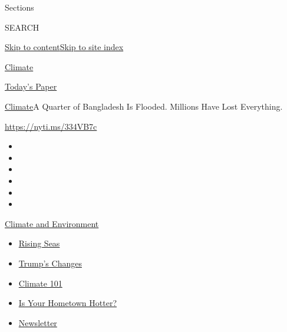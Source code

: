 Sections

SEARCH

\protect\hyperlink{site-content}{Skip to
content}\protect\hyperlink{site-index}{Skip to site index}

\href{https://www.nytimes.com/section/climate}{Climate}

\href{https://myaccount.nytimes.com/auth/login?response_type=cookie\&client_id=vi}{}

\href{https://www.nytimes.com/section/todayspaper}{Today's Paper}

\href{/section/climate}{Climate}\textbar{}A Quarter of Bangladesh Is
Flooded. Millions Have Lost Everything.

\url{https://nyti.ms/334VB7c}

\begin{itemize}
\item
\item
\item
\item
\item
\item
\end{itemize}

\href{https://www.nytimes.com/section/climate?action=click\&pgtype=Article\&state=default\&region=TOP_BANNER\&context=storylines_menu}{Climate
and Environment}

\begin{itemize}
\tightlist
\item
  \href{https://www.nytimes.com/2020/07/30/climate/sea-level-inland-floods.html?action=click\&pgtype=Article\&state=default\&region=TOP_BANNER\&context=storylines_menu}{Rising
  Seas}
\item
  \href{https://www.nytimes.com/interactive/2020/climate/trump-environment-rollbacks.html?action=click\&pgtype=Article\&state=default\&region=TOP_BANNER\&context=storylines_menu}{Trump's
  Changes}
\item
  \href{https://www.nytimes.com/interactive/2020/04/19/climate/climate-crash-course-1.html?action=click\&pgtype=Article\&state=default\&region=TOP_BANNER\&context=storylines_menu}{Climate
  101}
\item
  \href{https://www.nytimes.com/interactive/2018/08/30/climate/how-much-hotter-is-your-hometown.html?action=click\&pgtype=Article\&state=default\&region=TOP_BANNER\&context=storylines_menu}{Is
  Your Hometown Hotter?}
\item
  \href{https://www.nytimes.com/newsletters/climate-change?action=click\&pgtype=Article\&state=default\&region=TOP_BANNER\&context=storylines_menu}{Newsletter}
\end{itemize}


